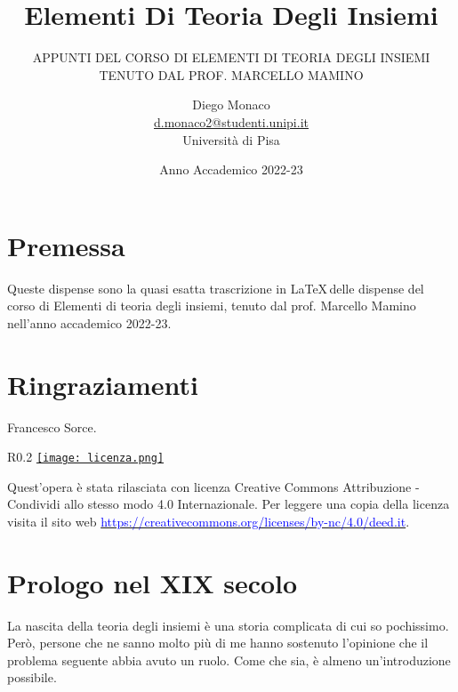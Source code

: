 \documentclass[11pt]{scrartcl}
\begin{document}
\title{Elementi Di Teoria Degli Insiemi}
\subtitle{\large\normalfont\rmfamily\scshape APPUNTI DEL CORSO DI ELEMENTI DI TEORIA DEGLI INSIEMI \\ TENUTO DAL PROF. MARCELLO MAMINO}
\author{Diego Monaco \\ \textnormal{\href{d.monaco2@studenti.unipi.it}{d.monaco2@studenti.unipi.it}} \\ Università di Pisa}
\date{Anno Accademico 2022-23}
\maketitle
\newpage

\tableofcontents
\eject
\newpage

\section*{Premessa}
Queste dispense sono la quasi esatta trascrizione in \LaTeX\,delle dispense del corso di Elementi di teoria degli insiemi, tenuto dal prof. Marcello Mamino nell'anno accademico 2022-23.

\section*{Ringraziamenti}
Francesco Sorce.

\mbox{}
\vfill
\begin{wrapfigure}{R}{0.2\textwidth}
	\centering
	\href{https://creativecommons.org/licenses/by-nc/4.0/deed.it}{\texttt{[image: licenza.png]}}
\end{wrapfigure}

Quest'opera è stata rilasciata con licenza Creative Commons Attribuzione - Condividi allo stesso modo 4.0 Internazionale. Per leggere
una copia della licenza visita il sito web \href{http://creativecommons.org/licenses/by-sa/4.0/deed.it}{\textcolor{blue}{https://creativecommons.org/licenses/by-nc/4.0/deed.it}}.\\

\newpage
\section{Prologo nel XIX secolo}
La nascita della teoria degli insiemi è una storia complicata di cui so pochissimo. Però, persone che ne sanno molto più di me hanno sostenuto l'opinione che il problema seguente
abbia avuto un ruolo. Come che sia, è almeno un'introduzione possibile.
\end{document}
